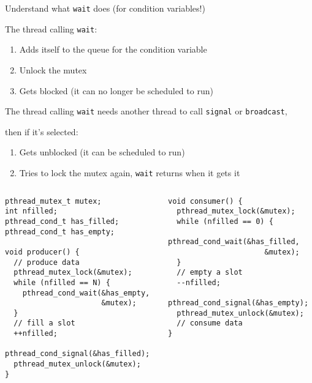   \begin{slide}


    Understand what \texttt{wait} does (for condition variables!)
    \medskip

    The thread calling \texttt{wait}:

    \begin{enumerate}
      \item Adds itself to the queue for the condition variable
      \item Unlock the mutex
      \item Gets blocked (it can no longer be scheduled to run)
    \end{enumerate}
    \medskip

    The thread calling \texttt{wait} needs another thread to call \texttt{signal} or
    \texttt{broadcast},

    then if it's selected:

    \begin{enumerate}
      \item Gets unblocked (it can be scheduled to run)
      \item Tries to lock the mutex again, \texttt{wait} returns when it gets it
    \end{enumerate}

  \end{slide}

  \begin{slide}


    \begin{columns}
      \begin{column}{0.5\textwidth}
        \begin{verbatim}
pthread_mutex_t mutex;
int nfilled;
pthread_cond_t has_filled;
pthread_cond_t has_empty;

void producer() {
  // produce data
  pthread_mutex_lock(&mutex);
  while (nfilled == N) {
    pthread_cond_wait(&has_empty,
                      &mutex);
  }
  // fill a slot
  ++nfilled;
  pthread_cond_signal(&has_filled);
  pthread_mutex_unlock(&mutex);
}
        \end{verbatim}
      \end{column}
      \begin{column}{0.5\textwidth}
        \begin{verbatim}
void consumer() {
  pthread_mutex_lock(&mutex);
  while (nfilled == 0) {
    pthread_cond_wait(&has_filled,
                      &mutex);
  }
  // empty a slot
  --nfilled;
  pthread_cond_signal(&has_empty);
  pthread_mutex_unlock(&mutex);
  // consume data
}
        \end{verbatim}
      \end{column}
    \end{columns}

  \end{slide}

